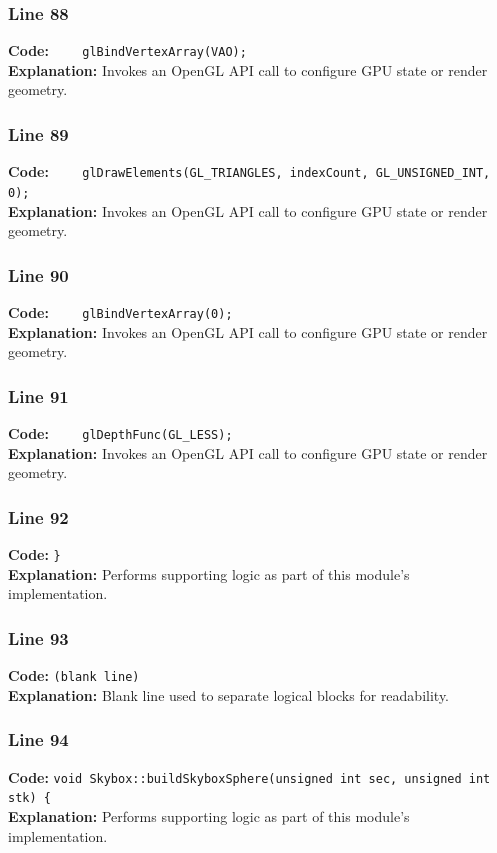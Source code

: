 \documentclass[11pt,a4paper]{article}
\begin{document}
\subsubsection*{Line 88}
\textbf{Code:} \verb|    glBindVertexArray(VAO);|\\
\textbf{Explanation:} Invokes an OpenGL API call to configure GPU state or render geometry.

\subsubsection*{Line 89}
\textbf{Code:} \verb|    glDrawElements(GL_TRIANGLES, indexCount, GL_UNSIGNED_INT, 0);|\\
\textbf{Explanation:} Invokes an OpenGL API call to configure GPU state or render geometry.

\subsubsection*{Line 90}
\textbf{Code:} \verb|    glBindVertexArray(0);|\\
\textbf{Explanation:} Invokes an OpenGL API call to configure GPU state or render geometry.

\subsubsection*{Line 91}
\textbf{Code:} \verb|    glDepthFunc(GL_LESS);|\\
\textbf{Explanation:} Invokes an OpenGL API call to configure GPU state or render geometry.

\subsubsection*{Line 92}
\textbf{Code:} \verb|}|\\
\textbf{Explanation:} Performs supporting logic as part of this module's implementation.

\subsubsection*{Line 93}
\textbf{Code:} \texttt{(blank line)}\\
\textbf{Explanation:} Blank line used to separate logical blocks for readability.

\subsubsection*{Line 94}
\textbf{Code:} \verb|void Skybox::buildSkyboxSphere(unsigned int sec, unsigned int stk) {|\\
\textbf{Explanation:} Performs supporting logic as part of this module's implementation.
\end{document}
